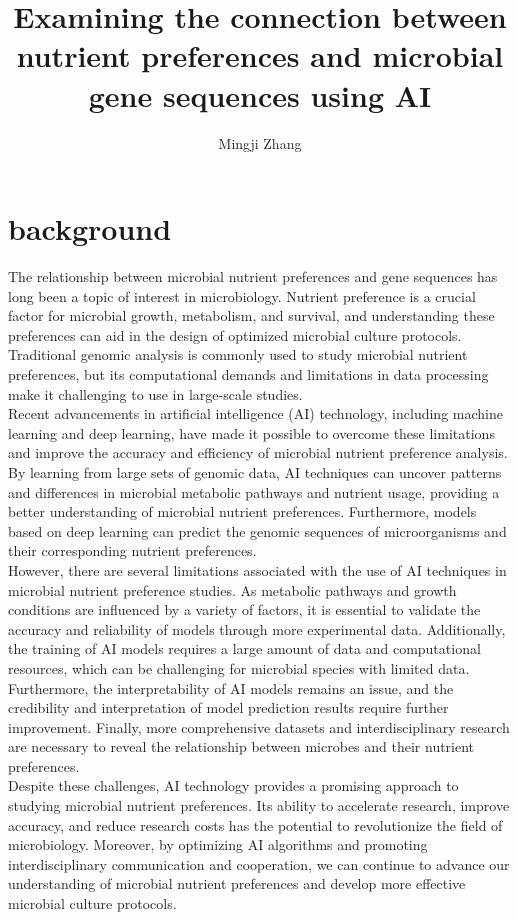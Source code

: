 \documentclass{article}
\title{Examining the connection between nutrient preferences and 
microbial gene sequences using AI
}
\author{Mingji Zhang}
\begin{document}
\maketitle

\section{background}

The relationship between microbial nutrient preferences and gene sequences has long been a topic of interest in microbiology. Nutrient preference is a crucial factor for microbial growth, metabolism, and survival, and understanding these preferences can aid in the design of optimized microbial culture protocols. Traditional genomic analysis is commonly used to study microbial nutrient preferences, but its computational demands and limitations in data processing make it challenging to use in large-scale studies.\\

Recent advancements in artificial intelligence (AI) technology, including machine learning and deep learning, have made it possible to overcome these limitations and improve the accuracy and efficiency of microbial nutrient preference analysis. By learning from large sets of genomic data, AI techniques can uncover patterns and differences in microbial metabolic pathways and nutrient usage, providing a better understanding of microbial nutrient preferences. Furthermore, models based on deep learning can predict the genomic sequences of microorganisms and their corresponding nutrient preferences.\\

However, there are several limitations associated with the use of AI techniques in microbial nutrient preference studies. As metabolic pathways and growth conditions are influenced by a variety of factors, it is essential to validate the accuracy and reliability of models through more experimental data. Additionally, the training of AI models requires a large amount of data and computational resources, which can be challenging for microbial species with limited data. Furthermore, the interpretability of AI models remains an issue, and the credibility and interpretation of model prediction results require further improvement. Finally, more comprehensive datasets and interdisciplinary research are necessary to reveal the relationship between microbes and their nutrient preferences.\\

Despite these challenges, AI technology provides a promising approach to studying microbial nutrient preferences. Its ability to accelerate research, improve accuracy, and reduce research costs has the potential to revolutionize the field of microbiology. Moreover, by optimizing AI algorithms and promoting interdisciplinary communication and cooperation, we can continue to advance our understanding of microbial nutrient preferences and develop more effective microbial culture protocols.\\
\end{document}
